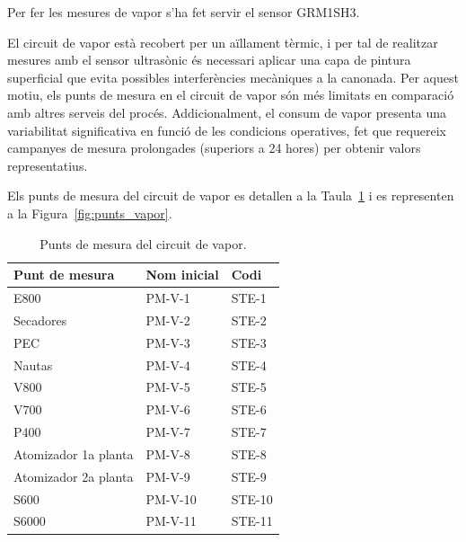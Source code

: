 \documentclass[11pt]{article}
\begin{document}
Per fer les mesures de vapor s'ha fet servir el sensor GRM1SH3.

El circuit de vapor està recobert per un aïllament tèrmic, i per tal de realitzar mesures amb el sensor ultrasònic és necessari aplicar una capa de pintura superficial que evita possibles interferències mecàniques a la canonada. Per aquest motiu, els punts de mesura en el circuit de vapor són més limitats en comparació amb altres serveis del procés. Addicionalment, el consum de vapor presenta una variabilitat significativa en funció de les condicions operatives, fet que requereix campanyes de mesura prolongades (superiors a 24 hores) per obtenir valors representatius.

Els punts de mesura del circuit de vapor es detallen a la Taula~\ref{tab:taula_punts_vapor} i es representen a la Figura~\ref{fig:punts_vapor}.

\begin{table}[htbp]
    \centering
    \caption{Punts de mesura del circuit de vapor.}
    \label{tab:taula_punts_vapor}
    \begin{tabular}{lll}
        \toprule
        \textbf{Punt de mesura} & \textbf{Nom inicial} & \textbf{Codi} \\
        \midrule
        E800                    & PM-V-1               & STE-1         \\
        Secadores               & PM-V-2               & STE-2         \\
        PEC                     & PM-V-3               & STE-3         \\
        Nautas                  & PM-V-4               & STE-4         \\
        V800                    & PM-V-5               & STE-5         \\
        V700                    & PM-V-6               & STE-6         \\
        P400                    & PM-V-7               & STE-7         \\
        Atomizador 1a planta    & PM-V-8               & STE-8         \\
        Atomizador 2a planta    & PM-V-9               & STE-9         \\
        S600                    & PM-V-10              & STE-10        \\
        S6000                   & PM-V-11              & STE-11        \\
        \bottomrule
    \end{tabular}
\end{table}
\end{document}
